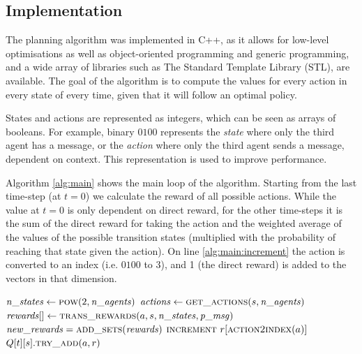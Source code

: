\documentclass{article}
\begin{document}
\begin{multicols}{2}
		\clearpage
		\subsection{Implementation}
		\label{sub:implementation}
		The planning algorithm was implemented in C++, as it allows for low-level
		optimisations as well as object-oriented programming and generic
		programming, and a wide array of libraries such as The Standard Template
		Library (STL), are available.
		The goal of the algorithm is to compute the values for every action in
		every state of every time, given that it will follow an optimal policy.

		States and actions are represented as integers, which can be seen as
		arrays of booleans. For example, binary $0100$ represents the
		\emph{state} where only the third agent has a message, or the
		\emph{action} where only the third agent sends a message, dependent on
		context. This representation is used to improve performance.

		Algorithm \ref{alg:main} shows the main loop of the algorithm. Starting
		from the last time-step (at $t=0$) we calculate the reward of all
		possible actions.
		While the value at $t=0$ is only dependent on direct reward, for the
		other time-steps it is the sum of the direct reward for taking the action
		and the weighted average of the values of the possible transition states
		(multiplied with the probability of reaching that state given the
		action). On line \ref{alg:main:increment} the action is converted to an
		index (i.e. $0100$ to 3), and 1 (the direct reward) is added to the
		vectors in that dimension.

		\end{multicols}
		\begin{algorithm}[h]
			\begin{algorithmic}[1]
				\State $\mathit{n\_states} \gets \Call{pow}{2, \mathit{n\_agents}}$
				 
				\State $\mathit{actions} \gets \Call{get\_actions}{s, \mathit{n\_agents}}$
				\State $\mathit{rewards}[] \gets \Call{trans\_rewards}{a, s, \mathit{n\_states}, \mathit{p\_msg}}$
				\State $\mathit{new\_rewards} = \Call{add\_sets}{\mathit{rewards}}$
				 
				\State $\Call{increment}{}~r[\Call{action2index}{a}]$ \label{alg:main:increment}
				\State $Q[t][s].\Call{try\_add}{a, r}$ 
				\EndFor
				\EndIf
				\EndFor
				\EndFor
				\EndFor
				\EndProcedure
			\end{algorithmic}
			\label{alg:main}
		\end{algorithm}
\end{document}
